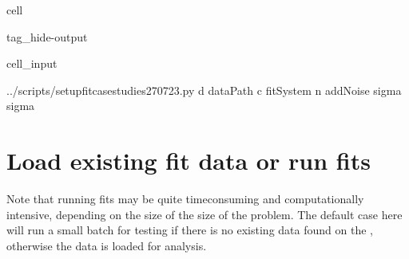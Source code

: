 \documentclass[letterpaper,table,10pt,english]{jupyterBook}
\begin{document}
\begin{sphinxuseclass}{cell}
\begin{sphinxuseclass}{tag_hide-output}\begin{sphinxVerbatimInput}

\begin{sphinxuseclass}{cell_input}
\begin{sphinxVerbatim}[commandchars=\\\{\}]

  

 \PYGZdq{}../scripts/setup\PYGZus{}fit\PYGZus{}case\PYGZhy{}studies\PYGZus{}270723.py\PYGZdq{} \PYGZhy{}d \PYGZob{}dataPath\PYGZcb{} \PYGZhy{}c \PYGZob{}fitSystem\PYGZcb{} \PYGZhy{}n \PYGZob{}addNoise\PYGZcb{} \PYGZhy{}\PYGZhy{}sigma \PYGZob{}sigma\PYGZcb{}
\end{sphinxVerbatim}

\end{sphinxuseclass}\end{sphinxVerbatimInput}

\end{sphinxuseclass}
\end{sphinxuseclass}

\section{Load existing fit data or run fits}
\label{\detokenize{part2/case-study-N2_290723:load-existing-fit-data-or-run-fits}}
\sphinxAtStartPar
Note that running fits may be quite time\sphinxhyphen{}consuming and computationally intensive, depending on the size of the size of the problem. The default case here will run a small batch for testing if there is no existing data found on the , otherwise the data is loaded for analysis.
\end{document}
